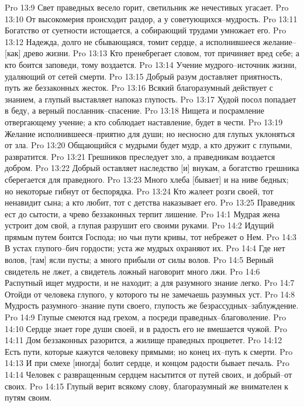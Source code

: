 Pro 13:9  Свет праведных весело горит, светильник же нечестивых угасает.
Pro 13:10  От высокомерия происходит раздор, а у советующихся--мудрость.
Pro 13:11  Богатство от суетности истощается, а собирающий трудами умножает его.
Pro 13:12  Надежда, долго не сбывающаяся, томит сердце, а исполнившееся желание--[как] древо жизни.
Pro 13:13  Кто пренебрегает словом, тот причиняет вред себе; а кто боится заповеди, тому воздается.
Pro 13:14  Учение мудрого--источник жизни, удаляющий от сетей смерти.
Pro 13:15  Добрый разум доставляет приятность, путь же беззаконных жесток.
Pro 13:16  Всякий благоразумный действует с знанием, а глупый выставляет напоказ глупость.
Pro 13:17  Худой посол попадает в беду, а верный посланник--спасение.
Pro 13:18  Нищета и посрамление отвергающему учение; а кто соблюдает наставление, будет в чести.
Pro 13:19  Желание исполнившееся--приятно для души; но несносно для глупых уклоняться от зла.
Pro 13:20  Общающийся с мудрыми будет мудр, а кто дружит с глупыми, развратится.
Pro 13:21  Грешников преследует зло, а праведникам воздается добром.
Pro 13:22  Добрый оставляет наследство [и] внукам, а богатство грешника сберегается для праведного.
Pro 13:23  Много хлеба [бывает] и на ниве бедных; но некоторые гибнут от беспорядка.
Pro 13:24  Кто жалеет розги своей, тот ненавидит сына; а кто любит, тот с детства наказывает его.
Pro 13:25  Праведник ест до сытости, а чрево беззаконных терпит лишение.
Pro 14:1  Мудрая жена устроит дом свой, а глупая разрушит его своими руками.
Pro 14:2  Идущий прямым путем боится Господа; но чьи пути кривы, тот небрежет о Нем.
Pro 14:3  В устах глупого--бич гордости; уста же мудрых охраняют их.
Pro 14:4  Где нет волов, [там] ясли пусты; а много прибыли от силы волов.
Pro 14:5  Верный свидетель не лжет, а свидетель ложный наговорит много лжи.
Pro 14:6  Распутный ищет мудрости, и не находит; а для разумного знание легко.
Pro 14:7  Отойди от человека глупого, у которого ты не замечаешь разумных уст.
Pro 14:8  Мудрость разумного--знание пути своего, глупость же безрассудных--заблуждение.
Pro 14:9  Глупые смеются над грехом, а посреди праведных--благоволение.
Pro 14:10  Сердце знает горе души своей, и в радость его не вмешается чужой.
Pro 14:11  Дом беззаконных разорится, а жилище праведных процветет.
Pro 14:12  Есть пути, которые кажутся человеку прямыми; но конец их--путь к смерти.
Pro 14:13  И при смехе [иногда] болит сердце, и концом радости бывает печаль.
Pro 14:14  Человек с развращенным сердцем насытится от путей своих, и добрый--от своих.
Pro 14:15  Глупый верит всякому слову, благоразумный же внимателен к путям своим.

